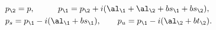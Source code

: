 \begin{equation}\begin{aligned}
{} & p_\2=p, \qquad\;\;\; p_\1=p_\2+i(\al_\1+\al_\2+bs_\1+bs_\2),\\ 
{} & p_s=p_\1-i(\al_\1+bs_\1), \qquad p_u=p_\1-i(\al_\2+bt_\2).
\end{aligned}
\end{equation}

